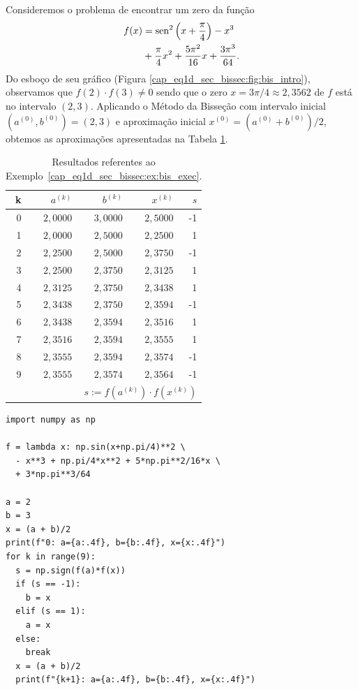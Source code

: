 \begin{ex}\label{cap_eq1d_sec_bissec:ex:bis_exec}
  Consideremos o problema de encontrar um zero da função
  \begin{equation}
    \begin{aligned}
      f(x) &= \operatorname{sen}^2\left(x+\frac{\pi}{4}\right) - x^3 \\
           &+ \frac{\pi}{4}x^2 + \frac{5\pi^2}{16}x + \frac{3\pi^3}{64}.
    \end{aligned}
\end{equation}
Do esboço de seu gráfico (Figura \ref{cap_eq1d_sec_bissec:fig:bis_intro}), observamos que $f(2)\cdot f(3) \neq 0$ sendo que o zero $x=3\pi/4\approx 2,3562$ de $f$ está no intervalo $(2, 3)$. Aplicando o Método da Bisseção com intervalo inicial $(a^{(0)}, b^{(0)}) = (2, 3)$ e aproximação inicial $x^{(0)} = (a^{(0)}+b^{(0)})/2$, obtemos as aproximações apresentadas na Tabela \ref{cap_eq1d_sec_bissec:tab:bis_exec}.

\begin{table}[h!]
  \centering
  \caption{Resultados referentes ao Exemplo~\ref{cap_eq1d_sec_bissec:ex:bis_exec}.}
  \begin{tabular}{r|rr|r|r}
    k & $a^{(k)}$ & $b^{(k)}$ & $x^{(k)}$ & $s$ \\\hline
    0 & $2,0000$ & $3,0000$ & $2,5000$ & -1 \\
    1 & $2,0000$ & $2,5000$ & $2,2500$ &  1 \\
    2 & $2,2500$ & $2,5000$ & $2,3750$ & -1 \\
    3 & $2,2500$ & $2,3750$ & $2,3125$ & 1 \\
    4 & $2,3125$ & $2,3750$ & $2,3438$ & 1 \\
    5 & $2,3438$ & $2,3750$ & $2,3594$ &  -1 \\
    6 & $2,3438$ & $2,3594$ & $2,3516$ & 1 \\
    7 & $2,3516$ & $2,3594$ & $2,3555$ &  1 \\
    8 & $2,3555$ & $2,3594$ & $2,3574$ &  -1 \\
    9 & $2,3555$ & $2,3574$ & $2,3564$ & -1 \\\hline
    \multicolumn{5}{r}{\small $s := f(a^{(k)})\cdot f(x^{(k)})$}
  \end{tabular}
  \label{cap_eq1d_sec_bissec:tab:bis_exec}
\end{table}

\begin{lstlisting}
import numpy as np

f = lambda x: np.sin(x+np.pi/4)**2 \
  - x**3 + np.pi/4*x**2 + 5*np.pi**2/16*x \
  + 3*np.pi**3/64

a = 2
b = 3
x = (a + b)/2
print(f"0: a={a:.4f}, b={b:.4f}, x={x:.4f}")
for k in range(9):
  s = np.sign(f(a)*f(x))
  if (s == -1):
    b = x
  elif (s == 1):
    a = x
  else:
    break
  x = (a + b)/2
  print(f"{k+1}: a={a:.4f}, b={b:.4f}, x={x:.4f}")
\end{lstlisting}

\end{ex}

